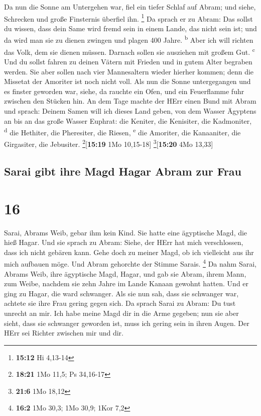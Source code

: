  Da nun die Sonne am Untergehen war, fiel ein tiefer
Schlaf auf Abram; und siehe, Schrecken und große Finsternis überfiel
ihn. \footnote{\textbf{15:12} Hi 4,13-14}  Da sprach er
zu Abram: Das sollst du wissen, dass dein Same wird fremd sein in einem
Lande, das nicht sein ist; und da wird man sie zu dienen zwingen und
plagen 400 Jahre. \textsuperscript{b}  Aber ich will
richten das Volk, dem sie dienen müssen. Darnach sollen sie ausziehen
mit großem Gut. \textsuperscript{c}  Und du sollst fahren
zu deinen Vätern mit Frieden und in gutem Alter begraben werden.
 Sie aber sollen nach vier Mannesaltern wieder hierher
kommen; denn die Missetat der Amoriter ist noch nicht voll.
 Als nun die Sonne untergegangen und es finster geworden
war, siehe, da rauchte ein Ofen, und ein Feuerflamme fuhr zwischen den
Stücken hin.  An dem Tage machte der HErr einen Bund mit
Abram und sprach: Deinem Samen will ich dieses Land geben, von dem
Wasser Ägyptens an bis an das große Wasser Euphrat:  die
Keniter, die Kenisiter, die Kadmoniter, \textsuperscript{d}
 die Hethiter, die Pheresiter, die Riesen,
\textsuperscript{e}  die Amoriter, die Kanaaniter, die
Girgasiter, die Jebusiter. \footnote{\textbf{18:21} 1Mo 11,5; Ps
  34,16-17}{[}\textbf{15:19} 1Mo 10,15-18{]}
\footnote{\textbf{21:6} 1Mo 18,12}{[}\textbf{15:20} 4Mo 13,33{]}

\hypertarget{sarai-gibt-ihre-magd-hagar-abram-zur-frau}{%
\subsection{Sarai gibt ihre Magd Hagar Abram zur
Frau}\label{sarai-gibt-ihre-magd-hagar-abram-zur-frau}}

\hypertarget{section-15}{%
\section{16}\label{section-15}}

 Sarai, Abrams Weib, gebar ihm kein Kind. Sie hatte eine
ägyptische Magd, die hieß Hagar.  Und sie sprach zu Abram:
Siehe, der HErr hat mich verschlossen, dass ich nicht gebären kann. Gehe
doch zu meiner Magd, ob ich vielleicht aus ihr mich aufbauen möge. Und
Abram gehorchte der Stimme Sarais. \footnote{\textbf{16:2} 1Mo 30,3; 1Mo
  30,9; 1Kor 7,2}  Da nahm Sarai, Abrams Weib, ihre
ägyptische Magd, Hagar, und gab sie Abram, ihrem Mann, zum Weibe,
nachdem sie zehn Jahre im Lande Kanaan gewohnt hatten. 
Und er ging zu Hagar, die ward schwanger. Als sie nun sah, dass sie
schwanger war, achtete sie ihre Frau gering gegen sich. 
Da sprach Sarai zu Abram: Du tust unrecht an mir. Ich habe meine Magd
dir in die Arme gegeben; nun sie aber sieht, dass sie schwanger geworden
ist, muss ich gering sein in ihren Augen. Der HErr sei Richter zwischen
mir und dir.

